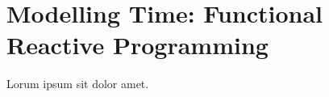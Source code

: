 \section{Modelling Time: Functional Reactive Programming}
\label{sec:frp}


Lorum ipsum sit dolor amet.  \lipsum[2-4]